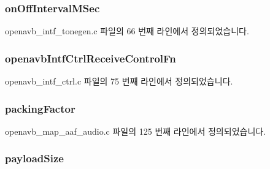 \subsubsection[{\texorpdfstring{on\+Off\+Interval\+M\+Sec}{onOffIntervalMSec}}]{ on\+Off\+Interval\+M\+Sec}\hypertarget{structpvt__data__t_a81da92af9cf46efd1630f7ec1329759f}{}\label{structpvt__data__t_a81da92af9cf46efd1630f7ec1329759f}


openavb\+\_\+intf\+\_\+tonegen.\+c 파일의 66 번째 라인에서 정의되었습니다.

\subsubsection[{\texorpdfstring{openavb\+Intf\+Ctrl\+Receive\+Control\+Fn}{openavbIntfCtrlReceiveControlFn}}]{ openavb\+Intf\+Ctrl\+Receive\+Control\+Fn}\hypertarget{structpvt__data__t_ae7693bd2f52c765ed9ffc87f5b19db5e}{}\label{structpvt__data__t_ae7693bd2f52c765ed9ffc87f5b19db5e}


openavb\+\_\+intf\+\_\+ctrl.\+c 파일의 75 번째 라인에서 정의되었습니다.

\subsubsection[{\texorpdfstring{packing\+Factor}{packingFactor}}]{ packing\+Factor}\hypertarget{structpvt__data__t_af54e12a5e4f46ccf41a32ff0ea9b3405}{}\label{structpvt__data__t_af54e12a5e4f46ccf41a32ff0ea9b3405}


openavb\+\_\+map\+\_\+aaf\+\_\+audio.\+c 파일의 125 번째 라인에서 정의되었습니다.

\subsubsection[{\texorpdfstring{payload\+Size}{payloadSize}}]{ payload\+Size}\hypertarget{structpvt__data__t_a88092a2989b4d9a0e8fc5d8ebf52607c}{}\label{structpvt__data__t_a88092a2989b4d9a0e8fc5d8ebf52607c}


